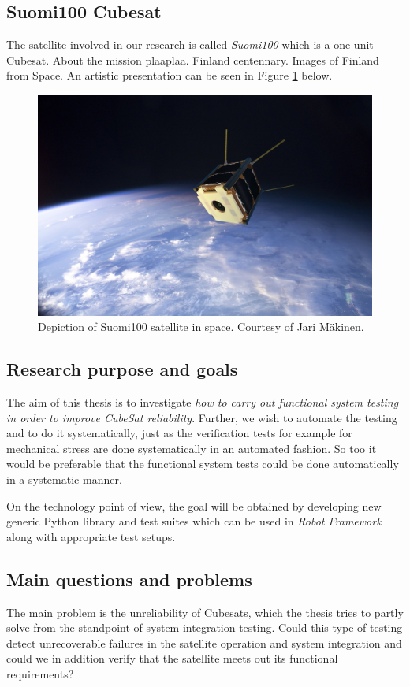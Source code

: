 \documentclass[english,12pt,a4paper,pdftex,elec,utf8]{aaltothesis}
\begin{document}
\subsection{Suomi100 Cubesat} 
The satellite involved in our research is called \textit{Suomi100} which is a one unit Cubesat. About the mission plaaplaa. Finland centennary. Images of Finland from Space. An artistic presentation can be seen in Figure \ref{s100intro} below.
\begin{figure}[!h]
\centering
\includegraphics[scale=0.2]{s100_orbit}
\caption{Depiction of Suomi100 satellite in space. Courtesy of Jari Mäkinen. \cite{s100blogi}}
\label{s100intro}
\end{figure} 
\subsection{Research purpose and goals}
The aim of this thesis is to investigate \textit{how to carry out
functional system testing in order to improve CubeSat reliability}. Further, we wish to automate the testing and to do it systematically, just as the verification tests for example for mechanical stress are done systematically in an automated fashion. So too it would be preferable that the functional system tests could be done automatically in a systematic manner.\par 
On the technology point of view, the goal will be obtained by developing new generic Python library and test suites which can be used in \textit{Robot Framework} \cite{robotmain} along with appropriate test setups.\par 
\subsection{Main questions and problems}
The main problem is the unreliability of Cubesats, which the thesis tries to partly solve from the standpoint of system integration testing. Could this type of testing detect unrecoverable failures in the satellite operation and system integration and could we in addition verify that the satellite meets out its functional requirements?
\end{document}
